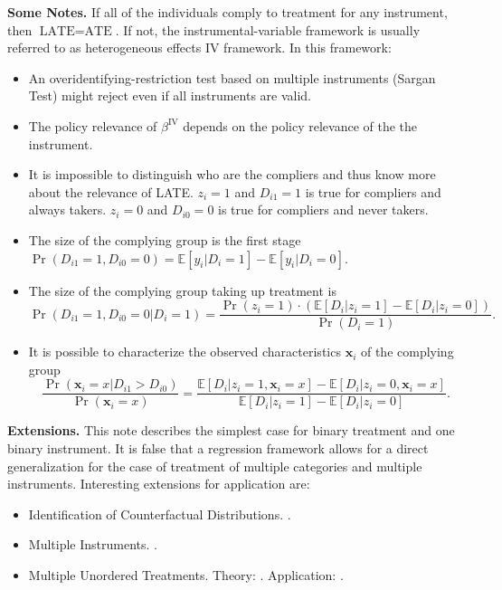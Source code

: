 \noindent \textbf{Some Notes.} If all of the individuals comply to treatment for any instrument, then $\text{LATE} =\text{ATE}$. If not, the instrumental-variable framework is usually referred to as heterogeneous effects IV framework. In this framework: 
\begin{itemize}
\item An overidentifying-restriction test based on multiple instruments (Sargan Test) might reject even if all instruments are valid. 
\item The policy relevance of $\beta^{\text{IV}}$ depends on the policy relevance of the the instrument. 
\item It is impossible to distinguish who are the compliers and thus know more about the relevance of LATE. $z_{i} = 1$ and $D_{i1} = 1$ is true for compliers and always takers. $z_{i} = 0$ and $D_{i0} = 0$ is true for compliers and never takers.
\item The size of the complying group is the first stage $\Pr \left( D_{i1} = 1, D_{i0} = 0 \right) = \mathbb{E} \left[ y_{i} | D_{i} = 1 \right] - \mathbb{E} \left[ y_{i} | D_{i} = 0 \right]$. 
\item The size of the complying group taking up treatment is 
\begin{equation}
\Pr \left( D_{i1} = 1, D_{i0} = 0 | D_{i} = 1 \right) = \frac{  \Pr \left( z_{i} = 1 \right) \cdot  \left( \mathbb{E} \left[ D_{i} | z_{i} = 1 \right] - \mathbb{E} \left[ D_{i} | z_{i} = 0 \right] \right)  }{ \Pr \left( D_{i} = 1 \right) }. 
\end{equation}
\item It is possible to characterize the observed characteristics $\bm{x}_i$ of the complying group 
\begin{equation}
\frac{\Pr \left( \bm{x}_i = x | D_{i1} > D_{i0} \right)} { \Pr \left( \bm{x}_i = x \right) }= \frac{\mathbb{E} \left[ D_{i} | z_{i} = 1, \bm{x}_i = x \right] - \mathbb{E} \left[ D_{i} | z_{i} = 0, \bm{x}_i = x \right]}{ \mathbb{E} \left[ D_{i} | z_{i} = 1 \right] - \mathbb{E} \left[ D_{i} | z_{i} = 0 \right] }. 
\end{equation}
\end{itemize}  

\noindent \textbf{Extensions.} This note describes the simplest case for binary treatment and one binary instrument. It is false that a regression framework allows for a direct generalization for the case of treatment of multiple categories and multiple instruments. Interesting extensions for application are: 

\begin{itemize} 
\item Identification of Counterfactual Distributions. \citet{imbens_estimating_1997}.
\item Multiple Instruments. \citet{mogstad_identification_2019}. 
\item Multiple Unordered Treatments. Theory: \citet{heckman_unordered_2018}. Application: \citet{kirkeboen_field_2016}. 
\end{itemize} 

\singlespacing


